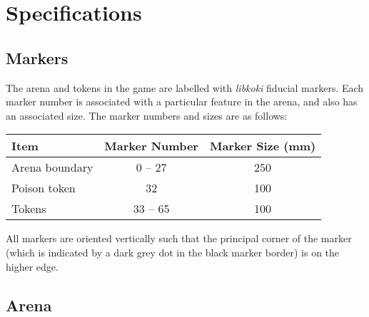 \section{Specifications}
\label{sec:specs}

\subsection{Markers}
\label{spec:markers}

The arena and tokens in the game are labelled with \emph{libkoki} fiducial
markers. Each marker number is associated with a particular feature in the
arena, and also has an associated size. The marker numbers and sizes are as
follows:

\begin{center}
\begin{tabular}{lcc}
  \toprule
  \textbf{Item} & \textbf{Marker Number} & \textbf{Marker Size (\si{mm})} \\
  \midrule
  Arena boundary & 0 -- 27 & 250 \\
  Poison token & 32 & 100 \\
  Tokens & 33 -- 65 & 100 \\
  \bottomrule
\end{tabular}
\end{center}

All markers are oriented vertically such that the principal corner of the marker
(which is indicated by a dark grey dot in the black marker border) is on the
higher edge.

\subsection{Arena}
\label{spec:arena}

